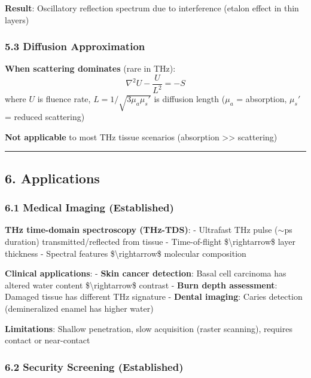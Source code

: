 \textbf{Result}: Oscillatory reflection spectrum due to interference
(etalon effect in thin layers)

\subsubsection{5.3 Diffusion
Approximation}\label{diffusion-approximation}

\textbf{When scattering dominates} (rare in THz):
\[\nabla^2 U - \frac{U}{L^2} = -S\] where \(U\) is fluence rate,
\(L = 1/\sqrt{3\mu_a \mu_s'}\) is diffusion length (\(\mu_a\) =
absorption, \(\mu_s'\) = reduced scattering)

\textbf{Not applicable} to most THz tissue scenarios (absorption
\textgreater\textgreater{} scattering)

\begin{center}\rule{0.5\linewidth}{0.5pt}\end{center}

\subsection{6. Applications}\label{applications}

\subsubsection{\texorpdfstring{6.1 Medical Imaging
(Established)}{6.1 Medical Imaging  (Established)}}\label{medical-imaging-established}

\textbf{THz time-domain spectroscopy (THz-TDS)}: - Ultrafast THz pulse
(\(\sim\)ps duration) transmitted/reflected from tissue - Time-of-flight
\$\textbackslash rightarrow\$ layer thickness - Spectral features
\$\textbackslash rightarrow\$ molecular composition

\textbf{Clinical applications}: - \textbf{Skin cancer detection}: Basal
cell carcinoma has altered water content \$\textbackslash rightarrow\$
contrast - \textbf{Burn depth assessment}: Damaged tissue has different
THz signature - \textbf{Dental imaging}: Caries detection (demineralized
enamel has higher water)

\textbf{Limitations}: Shallow penetration, slow acquisition (raster
scanning), requires contact or near-contact

\subsubsection{\texorpdfstring{6.2 Security Screening
(Established)}{6.2 Security Screening  (Established)}}\label{security-screening-established}

